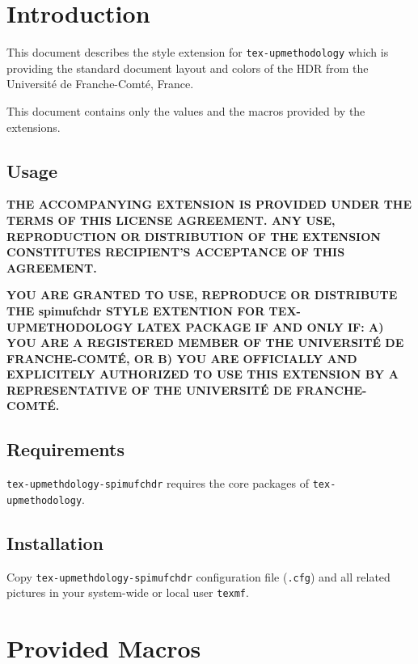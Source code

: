 \documentclass[english]{spimufchdr}
\begin{document}
\mainmatter

\chapter{Introduction}

This document describes the style extension for \texttt{tex-upmethodology} which is providing the standard document layout and colors of the HDR from the Universit\'e de Franche-Comt\'e, France.

This document contains only the values and the macros provided by the extensions.

\section{Usage}

\textbf{THE ACCOMPANYING EXTENSION IS PROVIDED UNDER THE TERMS OF THIS LICENSE AGREEMENT. ANY USE, REPRODUCTION OR DISTRIBUTION OF THE EXTENSION CONSTITUTES RECIPIENT'S ACCEPTANCE OF THIS AGREEMENT.}

\textbf{YOU ARE GRANTED TO USE, REPRODUCE OR DISTRIBUTE THE spimufchdr STYLE EXTENTION FOR TEX-UPMETHODOLOGY LATEX PACKAGE IF AND ONLY IF: A) YOU ARE A REGISTERED MEMBER OF THE UNIVERSIT\'E DE FRANCHE-COMT\'E, OR B) YOU ARE OFFICIALLY AND EXPLICITELY AUTHORIZED TO USE THIS EXTENSION BY A REPRESENTATIVE OF THE UNIVERSIT\'E DE FRANCHE-COMT\'E.}

\section{Requirements}

\texttt{tex-upmethdology-spimufchdr} requires the core packages of \texttt{tex-upmethodology}.

\section{Installation}

Copy \texttt{tex-upmethdology-spimufchdr} configuration file (\texttt{.cfg}) and all related pictures in your system-wide or local user \texttt{texmf}.

\chapter{Provided Macros}
\end{document}
